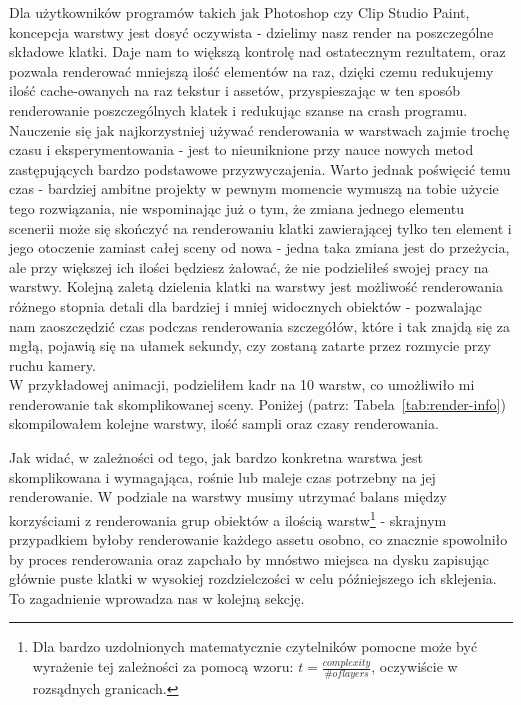 Dla użytkowników programów takich jak Photoshop czy Clip Studio Paint, koncepcja warstwy jest dosyć oczywista - dzielimy nasz render na poszczególne składowe klatki. Daje nam to większą kontrolę nad ostatecznym rezultatem, oraz pozwala renderować mniejszą ilość elementów na raz, dzięki czemu redukujemy ilość cache-owanych na raz tekstur i assetów, przyspieszając w ten sposób renderowanie poszczególnych klatek i redukując szanse na crash programu.\newpage
Nauczenie się jak najkorzystniej używać renderowania w warstwach zajmie trochę czasu i eksperymentowania - jest to nieuniknione przy nauce nowych metod zastępujących bardzo podstawowe przyzwyczajenia. Warto jednak poświęcić temu czas - bardziej ambitne projekty w pewnym momencie wymuszą na tobie użycie tego rozwiązania, nie wspominając już o tym, że zmiana jednego elementu scenerii może się skończyć na renderowaniu klatki zawierającej tylko ten element i jego otoczenie zamiast całej sceny od nowa - jedna taka zmiana jest do przeżycia, ale przy większej ich ilości będziesz żałować, że nie podzieliłeś swojej pracy na warstwy. Kolejną zaletą dzielenia klatki na warstwy jest możliwość renderowania różnego stopnia detali dla bardziej i mniej widocznych obiektów - pozwalając nam zaoszczędzić czas podczas renderowania szczegółów, które i tak znajdą się za mgłą, pojawią się na ułamek sekundy, czy zostaną zatarte przez rozmycie przy ruchu kamery. \\
W przykładowej animacji, podzieliłem kadr na 10 warstw, co umożliwiło mi renderowanie tak skomplikowanej sceny. Poniżej (patrz: Tabela~\ref{tab:render-info}) skompilowałem kolejne warstwy, ilość sampli oraz czasy renderowania.



Jak widać, w zależności od tego, jak bardzo konkretna warstwa jest skomplikowana i wymagająca, rośnie lub maleje czas potrzebny na jej renderowanie. W podziale na warstwy musimy utrzymać balans między korzyściami z renderowania grup obiektów a ilością warstw\footnote{Dla bardzo uzdolnionych matematycznie czytelników pomocne może być wyrażenie tej zależności za pomocą wzoru: \(t = \frac{complexity}{\# of layers}\), oczywiście w rozsądnych granicach.} - skrajnym przypadkiem byłoby renderowanie każdego assetu osobno, co znacznie spowolniło by proces renderowania oraz zapchało by mnóstwo  miejsca na dysku zapisując głównie puste klatki w wysokiej rozdzielczości w celu późniejszego ich sklejenia. To zagadnienie wprowadza nas w kolejną sekcję.

\newpage
